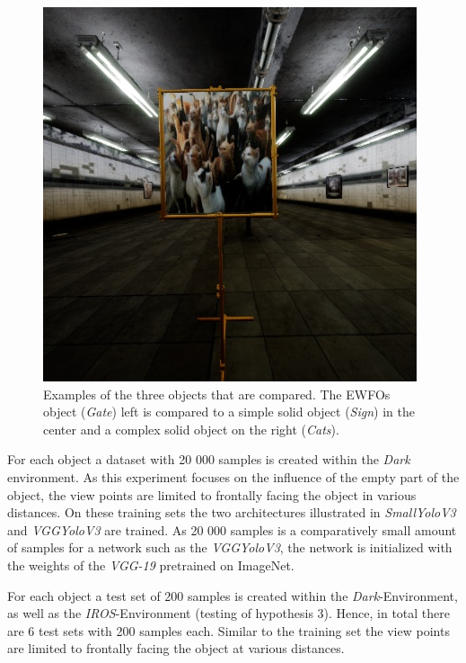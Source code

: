 \begin{figure}[hbtp]
\begin{minipage}{0.3\textwidth}
	\end{minipage}
	\begin{minipage}{0.3\textwidth}
		\includegraphics[width=\textwidth]{fig/cats}
	\end{minipage}
	\caption{Examples of the three objects that are compared. The \acp{EWFO} object (\textit{Gate}) left is compared to a simple solid object (\textit{Sign}) in the center and a complex solid object on the right (\textit{Cats}).}
	\label{fig:cats}
\end{figure}

For each object a dataset with 20 000 samples is created within the \textit{Dark} environment. As this experiment focuses on the influence of the empty part of the object, the view points are limited to frontally facing the object in various distances. On these training sets the two architectures illustrated in  \textit{SmallYoloV3} and \textit{VGGYoloV3} are trained. As 20 000 samples is a comparatively small amount of samples for a network such as the \textit{VGGYoloV3}, the network is initialized with the weights of the \textit{VGG-19} pretrained on ImageNet.

For each object a test set of 200 samples is created within the \textit{Dark}-Environment, as well as the \textit{IROS}-Environment (testing of hypothesis 3). Hence, in total there are 6 test sets with 200 samples each. Similar to the training set the view points are limited to frontally facing the object at various distances.



